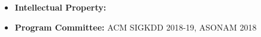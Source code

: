 
\begin{itemize}[nosep]
    \item {\bf Intellectual Property: } 
    \item {\bf Program Committee: } ACM SIGKDD 2018-19, ASONAM 2018
\end{itemize}
